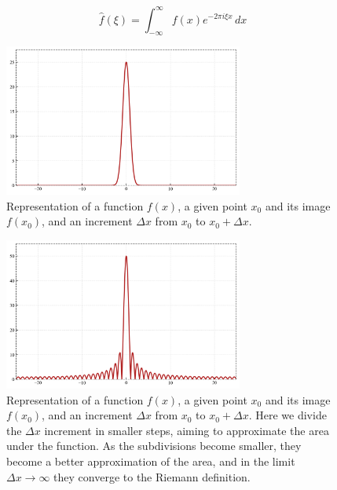 \documentclass{book}
\begin{document}
\[
\hat{f}(\xi) = \int_{-\infty}^{\infty} f(x) e^{-2\pi i \xi x} \, dx
\]

\begin{figure}[ht]
    \centering
    \includegraphics[width=0.7\textwidth]{figures/appendix/fourier_transform_1.png}
    \caption{Representation of a function $f(x)$, a given point $x_0$ and its image $f(x_0)$, and an increment $\Delta x$ from $x_0$ to $x_0 + \Delta x$.}
    \label{fig:fourier_series_1}
\end{figure}

\begin{figure}[ht]
    \centering
    \includegraphics[width=0.7\textwidth]{figures/appendix/fourier_transform_2.png}
    \caption{Representation of a function $f(x)$, a given point $x_0$ and its image $f(x_0)$, and an increment $\Delta x$ from $x_0$ to $x_0 + \Delta x$. Here we divide the $\Delta x$ increment in smaller steps, aiming to approximate the area under the function. As the subdivisions become smaller, they become a better approximation of the area, and in the limit $\Delta x \rightarrow \infty$ they converge to the Riemann definition.}
    \label{fig:fourier_series_2}
\end{figure}
\end{document}
